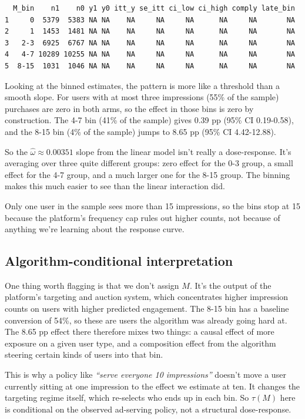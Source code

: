 \documentclass[
  letterpaper,
  DIV=11,
  numbers=noendperiod]{scrartcl}
\begin{document}
\begin{verbatim}
  M_bin    n1    n0 y1 y0 itt_y se_itt ci_low ci_high comply late_bin
1     0  5379  5383 NA NA    NA     NA     NA      NA     NA       NA
2     1  1453  1481 NA NA    NA     NA     NA      NA     NA       NA
3   2-3  6925  6767 NA NA    NA     NA     NA      NA     NA       NA
4   4-7 10289 10255 NA NA    NA     NA     NA      NA     NA       NA
5  8-15  1031  1046 NA NA    NA     NA     NA      NA     NA       NA
\end{verbatim}

Looking at the binned estimates, the pattern is more like a threshold
than a smooth slope. For users with at most three impressions (55\% of
the sample) purchases are zero in both arms, so the effect in those bins
is zero by construction. The 4-7 bin (41\% of the sample) gives 0.39 pp
(95\% CI 0.19-0.58), and the 8-15 bin (4\% of the sample) jumps to 8.65
pp (95\% CI 4.42-12.88).

So the \(\hat\omega \approx 0.00351\) slope from the linear model isn't
really a dose-response. It's averaging over three quite different
groups: zero effect for the 0-3 group, a small effect for the 4-7 group,
and a much larger one for the 8-15 group. The binning makes this much
easier to see than the linear interaction did.

Only one user in the sample sees more than 15 impressions, so the bins
stop at 15 because the platform's frequency cap rules out higher counts,
not because of anything we're learning about the response curve.

\subsection{Algorithm-conditional
interpretation}\label{algorithm-conditional-interpretation}

One thing worth flagging is that we don't assign \(M\). It's the output
of the platform's targeting and auction system, which concentrates
higher impression counts on users with higher predicted engagement. The
8-15 bin has a baseline conversion of 54\%, so these are users the
algorithm was already going hard at. The 8.65 pp effect there therefore
mixes two things: a causal effect of more exposure on a given user type,
and a composition effect from the algorithm steering certain kinds of
users into that bin.

This is why a policy like \emph{``serve everyone 10 impressions''}
doesn't move a user currently sitting at one impression to the effect we
estimate at ten. It changes the targeting regime itself, which
re-selects who ends up in each bin. So \(\tau(M)\) here is conditional
on the observed ad-serving policy, not a structural dose-response.
\end{document}
